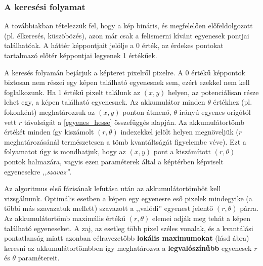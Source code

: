\subsubsection{A keresési folyamat}\label{sect:kereses_folyamata}

A továbbiakban tételezzük fel, hogy a kép bináris, és megfelelően előfeldolgozott (pl. élkeresés, küszöbözés), azon már csak a felismerni kívánt egyenesek pontjai találhatóak. A háttér képpontjait jelölje a 0 érték, az érdekes pontokat tartalmazó előtér képpontjai legyenek 1 értékűek.

A keresés folyamán bejárjuk a képteret pixelről pixelre. A 0 értékű képpontok biztosan nem részei egy képen található egyenesnek sem, ezért ezekkel nem kell foglalkozunk. Ha 1 értékű pixelt találunk az $ (x,y) $ helyen, az potenciálisan része lehet egy, a képen található egyenesnek. Az akkumulátor minden $ \theta $ értékhez (pl. fokonként) meghatározzuk az $ (x,y) $ ponton átmenő, $ \theta $ irányú egyenes origótól vett $ r $ távolságát a \eqref{egyenes_hesse} összefüggés alapján. Az akkumulátortömb értékét minden így kiszámolt $ (r,\theta) $ indexekkel jelölt helyen megnöveljük ($ r $ meghatározásánál természetesen a tömb kvantáltságát figyelembe véve). Ezt a folyamatot úgy is mondhatjuk, hogy az $ (x,y) $ pont a kiszámított $ (r, \theta) $ pontok halmazára, vagyis ezen paraméterek által a képtérben képviselt egyenesekre \emph{,,szavaz''}.

Az algoritmus első fázisának lefutása után az akkumulátortömböt kell vizsgálnunk. Optimális esetben a képen egy egyenesre eső pixelek mindegyike (a többi más szavazatuk mellett) szavazott a ,,valódi'' egyenest jelentő $ (r, \theta) $ párra. Az akkumulátortömb maximális értékű $ (r, \theta) $ elemei adják meg tehát a képen található egyeneseket. A zaj, az esetleg több pixel széles vonalak, és a kvantálási pontatlanság miatt azonban célravezetőbb \textbf{lokális maximumokat} (lásd  ábra) keresni az akkumulátortömbben így meghatározva a \textbf{legvalószínűbb} egyenesek $ r $ és $ \theta $ paramétereit.

